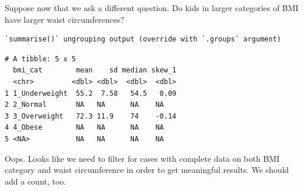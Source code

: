 \documentclass[
]{book}
\newenvironment{Shaded}{\begin{snugshade}}{\end{snugshade}}
\newcommand{\DataTypeTok}[1]{\textcolor[rgb]{0.13,0.29,0.53}{#1}}
\newcommand{\DecValTok}[1]{\textcolor[rgb]{0.00,0.00,0.81}{#1}}
\newcommand{\KeywordTok}[1]{\textcolor[rgb]{0.13,0.29,0.53}{\textbf{#1}}}
\newcommand{\NormalTok}[1]{#1}
\newcommand{\OperatorTok}[1]{\textcolor[rgb]{0.81,0.36,0.00}{\textbf{#1}}}
\newcommand{\StringTok}[1]{\textcolor[rgb]{0.31,0.60,0.02}{#1}}
\begin{document}
Suppose now that we ask a different question. Do kids in larger categories of BMI have larger waist circumferences?

\begin{Shaded}
\end{Shaded}

\begin{verbatim}
`summarise()` ungrouping output (override with `.groups` argument)
\end{verbatim}

\begin{verbatim}
# A tibble: 5 x 5
  bmi_cat        mean    sd median skew_1
  <chr>         <dbl> <dbl>  <dbl>  <dbl>
1 1_Underweight  55.2  7.58   54.5   0.09
2 2_Normal       NA   NA      NA    NA   
3 3_Overweight   72.3 11.9    74    -0.14
4 4_Obese        NA   NA      NA    NA   
5 <NA>           NA   NA      NA    NA   
\end{verbatim}

Oops. Looks like we need to filter for cases with complete data on both BMI category and waist circumference in order to get meaningful results. We should add a count, too.

\begin{Shaded}
\end{Shaded}
\end{document}

